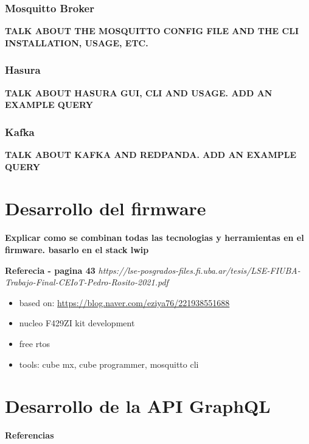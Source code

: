 \subsubsection{Mosquitto Broker}

\textbf{TALK ABOUT THE MOSQUITTO CONFIG FILE AND THE CLI INSTALLATION, USAGE, ETC.}


\subsubsection{Hasura}

\textbf{TALK ABOUT HASURA GUI, CLI AND USAGE. ADD AN EXAMPLE QUERY}


\subsubsection{Kafka}

\textbf{TALK ABOUT KAFKA AND REDPANDA. ADD AN EXAMPLE QUERY}


\section{Desarrollo del firmware}

\textbf{Explicar como se combinan todas las tecnologias y herramientas en el firmware. basarlo en el stack lwip}

\textbf{Referecia - pagina 43}
\textit{https://lse-posgrados-files.fi.uba.ar/tesis/LSE-FIUBA-Trabajo-Final-CEIoT-Pedro-Rosito-2021.pdf }


\begin{itemize}

  \item based on: \url{https://blog.naver.com/eziya76/221938551688}

  \item nucleo F429ZI kit development

  \item free rtos

  \item tools: cube mx, cube programmer, mosquitto cli

\end{itemize}



\section{Desarrollo de la API GraphQL}

\textbf{Referencias}

